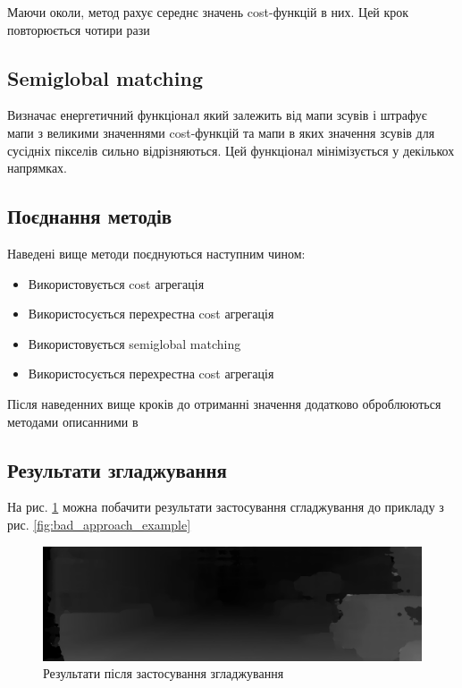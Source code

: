 \documentclass{article}
\theoremstyle{definition}
\begin{document}
Маючи околи, метод рахує середнє значень cost-функцій в них. Цей крок повторюється чотири рази

\subsection{Semiglobal matching}
Визначає енергетичний функціонал який залежить від мапи зсувів і штрафує мапи з великими значеннями cost-функцій та мапи в яких значення зсувів для сусідніх пікселів сильно відрізняються. Цей функціонал мінімізується у декількох напрямках.

\subsection{Поєднання методів}
Наведені вище методи поєднуються наступним чином:
\begin{itemize}
	\item Використовується cost агрегація
	\item Використосується перехрестна cost агрегація
	\item Використовується semiglobal matching
	\item Використосується перехрестна cost агрегація
\end{itemize}

Після наведенних вище кроків до отриманні значення додатково оброблюються методами описанними в \cite{zbontar2016stereo}

\subsection{Результати згладжування}
На рис. \ref{fig:smoothing_result} можна побачити результати застосування сгладжування до прикладу з рис. \ref{fig:bad_approach_example}
\begin{figure}[h]
	\includegraphics[width=\linewidth]{smoothing_result}
	\centering
	\caption{Результати після застосування згладжування}
	\label{fig:smoothing_result}
\end{figure}

\newpage

\printbibliography 
\end{document}
